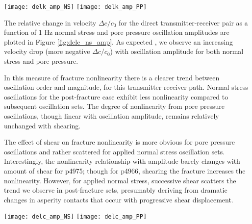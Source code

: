 \documentclass[draft]{agujournal2019}
\begin{document}
\begin{figure*}[ht]
	\centering
	\texttt{[image: delk\_amp\_NS]}
	\texttt{[image: delk\_amp\_PP]}
	\caption{Relative changes in permeability for dynamic stressing via applied normal stress (top row)  $ \sigma_{NS} $ and pore pressure (lower row) $ P_p $ at 1 Hz. Data are shown for the period just after the fracture formed (post-fracture) and after each increment of shear. Comparing post-fracture results to post-shear we observe a general reduction of permeability enhancement via dynamic stressing with smaller values of $ \Delta k/k_0 $. Gouge generated from shear is likely clogging flow pathways along the fracture plane. The hypothesized impediment to flow for the post-shear oscillation sets causes a reduction in permeability enhancement, especially for the post-shear 2 oscillation set.}
	\label{fig:perm_ns_amp}
\end{figure*}

The relative change in velocity $ \Delta c/c_0 $ for the direct transmitter-receiver pair as a function of 1 Hz normal stress and pore pressure oscillation amplitudes are plotted in Figure \ref{fig:delc_ns_amp}. As expected \cite{Riviere15}, we observe an increasing velocity drop (more negative $ \Delta c/c_0 $) with oscillation amplitude for both normal stress and pore pressure. 

In this measure of fracture nonlinearity there is a clearer trend between oscillation order and magnitude, for this transmitter-receiver path. Normal stress oscillations for the post-fracture case exhibit less nonlinearity compared to  subsequent oscillation sets. The degree of nonlinearity from pore pressure oscillations, though linear with oscillation amplitude, remains relatively unchanged with shearing. 

The effect of shear on fracture nonlinearity is more obvious for pore pressure oscillations and rather scattered for applied normal stress oscillation sets. Interestingly, the nonlinearity relationship with amplitude barely changes with amount of shear for p4975; though for p4966,  shearing the fracture increases the nonlinearity. However, for applied normal stress, successive shear scatters the trend we observe in post-fracture sets, presumably deriving from dramatic changes in asperity contacts that occur with progressive shear displacement.

\begin{figure*}[ht]
	\centering
	\texttt{[image: delc\_amp\_NS]}
	\texttt{[image: delc\_amp\_PP]}
	\caption{ Relative changes in p-wave speed for dynamic stressing via applied normal stress (top row)  $ \sigma_{NS} $ and pore pressure (lower row) $ P_p $. Data are shown for the direct transmitter-receiver pair (see Figure 2). Note that the magnitude of $ \Delta c $  increases as a function of oscillation amplitude. Transitioning from post-fracture results to post-shear results, we observe decreased and more scattered nonlinearity.}%
	\label{fig:delc_ns_amp}
\end{figure*}
\end{document}
